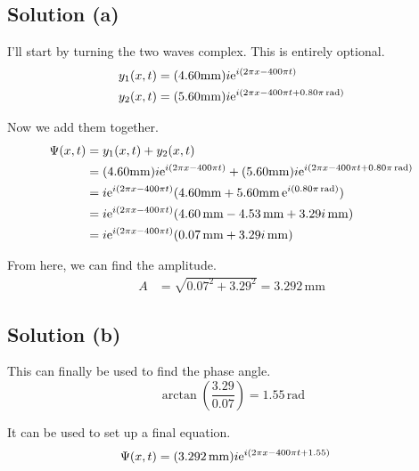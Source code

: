 \documentclass[12pt]{article}
\newcommand{\e}[1]{{\rm e}^{i\left( #1 \right)}}
\begin{document}
        \subsection{Solution (a)}
            I'll start by turning the two waves complex.
            This is entirely optional.
            \begin{align}
                y_1(x, t)   &=  (4.60 \unit{\milli\meter})i \e{2\pi x - 400\pi t}\\
                y_2(x, t)   &=  (5.60 \unit{\milli\meter})i \e{2\pi x - 400\pi t + 0.80\pi\,\unit{\radian}}
            \end{align}

            Now we add them together.
            \begin{align}
                \Psi(x,t)   &=  y_1(x, t) + y_2(x, t)\\
                    &=  (4.60 \unit{\milli\meter})i \e{2\pi x - 400\pi t} + (5.60 \unit{\milli\meter})i \e{2\pi x - 400\pi t + 0.80\pi\,\unit{\radian}}\\
                    &=  i \e{2\pi x - 400\pi t} (4.60 \unit{\milli\meter} + 5.60 \unit{\milli\meter}\,\e{0.80\pi\,\unit{\radian}})\\
                    &=  i \e{2\pi x - 400\pi t} (4.60\,\unit{\milli\meter} - 4.53\,\unit{\milli\meter} + 3.29i\,\unit{\milli\meter})\\
                    &=  i \e{2\pi x - 400\pi t} (0.07\,\unit{\milli\meter} + 3.29i\,\unit{\milli\meter})
            \end{align}

            From here, we can find the amplitude.
            \begin{align}
                A   &=  \sqrt{0.07^2 + 3.29^2}
                    =   \boxed{3.292\,\unit{\milli\meter}}
            \end{align}

        \subsection{Solution (b)}
            This can finally be used to find the phase angle.
            \begin{equation}
                \arctan\left( \frac{3.29}{0.07} \right) =   \boxed{1.55\,\unit{\radian}}
            \end{equation}

            It can be used to set up a final equation.
            \begin{align}
                \Psi(x,t)   &=  (3.292\,\unit{\milli\meter}) i \e{2\pi x - 400\pi t + 1.55}
            \end{align}
\end{document}
